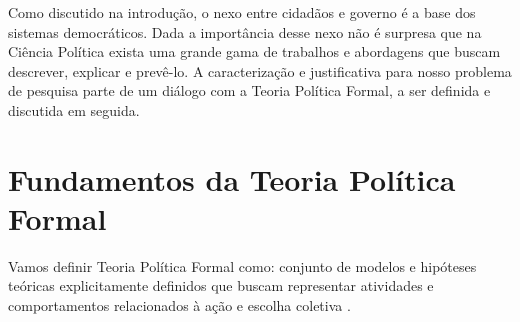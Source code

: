 Como discutido na introdução, o nexo entre cidadãos e governo é a base dos
sistemas democráticos. Dada a importância desse nexo não é surpresa que na
Ciência Política exista uma grande gama de trabalhos e abordagens que buscam
descrever, explicar e prevê-lo. A caracterização e justificativa para nosso
problema de pesquisa parte de um diálogo com a Teoria Política Formal, a ser
definida e discutida em seguida.

\section{Fundamentos da Teoria Política Formal}

Vamos definir Teoria Política Formal como: conjunto de modelos e hipóteses
teóricas explicitamente definidos que buscam representar atividades e
comportamentos relacionados à ação e escolha coletiva
\cite{oppenheimer2012principles,clarke2012model}.

